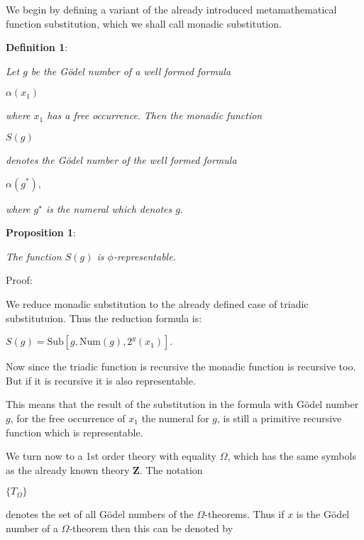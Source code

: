 \documentclass[12pt]{article}
\begin{document}
We begin by defining a variant of the already introduced metamathematical function substitution, which we shall call monadic substitution.

\textbf{Definition  1}:

\begin{center}
\emph{Let $g$ be the G\"odel number of a well formed formula}

$\alpha (x_1)$

\emph{where $x_1$ has a free occurrence.} 
\emph{Then the monadic function}

$S (g)$

\emph{denotes the G\"odel number of the well formed formula}

$\alpha (g^*),$

\emph{where $g^{\star}$ is the numeral which denotes $g.$}
\end{center}

\textbf{Proposition 1}:
                   
\begin{center}
\emph{The function $S (g)$ is $\phi$-representable.}
\end{center}

Proof:
 
We reduce monadic substitution to the already defined case of triadic substitutuion. Thus the reduction formula is:

\begin{center}
$S (g) =\text{Sub} [g,\text{Num} (g), 2^g (x_1)].$
\end{center}

Now since the triadic function is recursive the monadic function is recursive too. But if it is recursive it is also representable.

This means that the result of the substitution in the formula with G\"{o}del number $g$, for the free occurrence of $x_1$ the numeral for $g$, is still a primitive recursive function which is representable. 

We turn now to a 1st order theory with equality $\Omega$, which has the same symbols as the already known theory $\textbf{Z}$. The notation

\begin{center}
$\lbrace T_{\Omega} \rbrace$
\end{center}

denotes the set of all G\"odel numbers of the $\Omega$-theorems. Thus if $x$ is the G\"{o}del number of a $\Omega$-theorem then this can be denoted by
\end{document}

